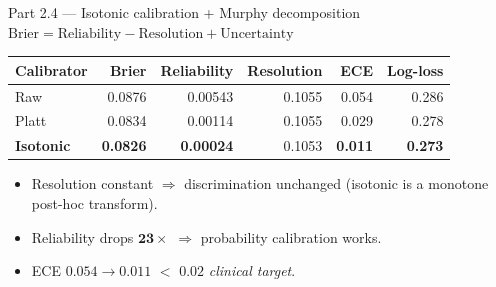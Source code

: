 \documentclass[aspectratio=169,10pt]{beamer}
\begin{document}
\begin{frame}{Part 2.4 --- Isotonic calibration + Murphy decomposition}
  \footnotesize
  \centering
  $\text{Brier} = \text{Reliability} - \text{Resolution} + \text{Uncertainty}$
  \vspace{0.5em}

  \begin{tabular}{@{} l r r r r r @{}}
    \toprule
    \textbf{Calibrator} & \textbf{Brier} & \textbf{Reliability} & \textbf{Resolution} & \textbf{ECE} & \textbf{Log-loss} \\
    \midrule
    Raw      & 0.0876          & 0.00543          & 0.1055          & 0.054          & 0.286 \\
    Platt    & 0.0834          & 0.00114          & 0.1055          & 0.029          & 0.278 \\
    \rowcolor{kkuGoldLight}
    \textbf{Isotonic} & \textbf{0.0826} & \textbf{0.00024} & 0.1053 & \textbf{0.011} & \textbf{0.273} \\
    \bottomrule
  \end{tabular}

  \vspace{0.6em}
  \begin{itemize}\setlength{\itemsep}{0.15em}
    \item Resolution constant $\Rightarrow$ discrimination unchanged
          (isotonic is a monotone post-hoc transform).
    \item Reliability drops $\mathbf{23\times}$ $\Rightarrow$
          probability calibration works.
    \item ECE $0.054 \to 0.011$ $<$ $0.02$ \emph{clinical target}.
  \end{itemize}
\end{frame}
\end{document}
